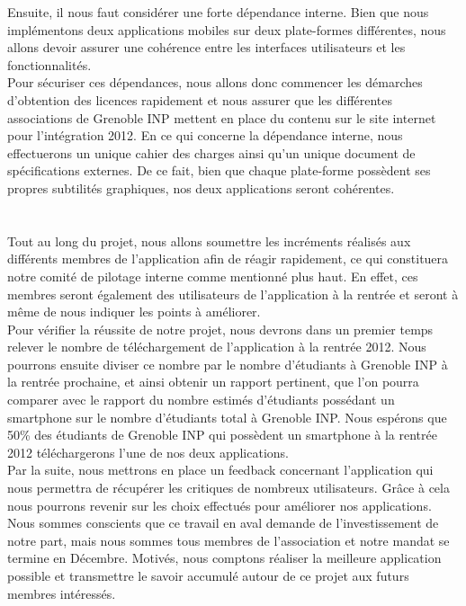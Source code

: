 \documentclass[a4paper,11px]{article}
\begin{document}
\indent Ensuite, il nous faut  considérer une forte dépendance interne. Bien que nous implémentons deux applications mobiles sur deux plate-formes différentes, nous allons devoir assurer une cohérence entre les interfaces utilisateurs et les fonctionnalités.\\
\indent Pour sécuriser ces dépendances, nous allons donc commencer les démarches d'obtention des licences rapidement et nous assurer que les différentes associations de Grenoble INP mettent en place du contenu sur le site internet pour l’intégration 2012. En ce qui concerne la dépendance interne, nous effectuerons un unique cahier des charges ainsi qu’un unique document de spécifications externes. De ce fait, bien que chaque plate-forme possèdent ses propres subtilités graphiques, nos deux applications seront cohérentes.\\
\\
\\
\indent Tout au long du projet, nous allons soumettre les incréments réalisés aux différents membres de l'application afin de réagir rapidement, ce qui constituera notre comité de pilotage interne comme mentionné plus haut. En effet, ces membres seront également des utilisateurs de l'application à la rentrée et seront à même de nous indiquer les points à améliorer. \\
Pour vérifier la réussite de notre projet, nous devrons dans un premier temps relever le nombre de téléchargement de l’application à la rentrée 2012. Nous pourrons ensuite diviser ce nombre par le nombre d'étudiants à Grenoble INP à la rentrée prochaine, et ainsi obtenir un rapport pertinent, que l'on pourra comparer avec le rapport du nombre estimés d'étudiants possédant un smartphone sur le nombre d'étudiants total à Grenoble INP. Nous espérons que 50\% des étudiants de Grenoble INP qui possèdent un smartphone à la rentrée 2012 téléchargerons l'une de nos deux applications.\\
\indent Par la suite, nous mettrons en place un feedback concernant l’application qui nous permettra de récupérer les critiques de nombreux utilisateurs. Grâce à cela nous pourrons revenir sur les choix effectués pour améliorer nos applications. Nous sommes conscients que ce travail en aval demande de l’investissement de notre part, mais nous sommes tous membres de l’association et notre mandat se termine en Décembre. Motivés, nous comptons réaliser la meilleure application possible et transmettre le savoir accumulé autour de ce projet aux futurs membres intéressés.
\end{document}
